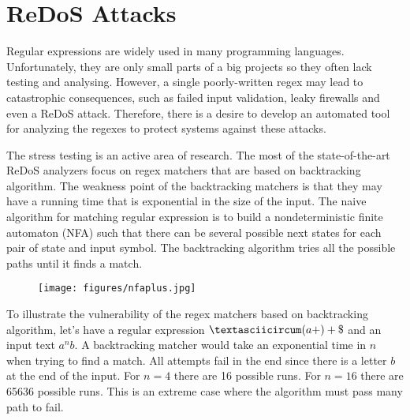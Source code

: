 \documentclass[acmsmall,screen]{acmart}
\begin{document}
\section{ReDoS Attacks}\label{sec:redos}
Regular expressions are widely used in many programming languages.
%
Unfortunately, they are only small parts of a big projects so they often lack testing and analysing.
%
However, a single poorly-written regex may lead to catastrophic consequences, such as failed input validation, leaky firewalls and 
%
even a ReDoS attack.
% 
Therefore, there is a desire to develop an automated tool for analyzing the regexes to protect systems against these attacks.
%



The stress testing is an active area of research.
%
The most of the state-of-the-art ReDoS analyzers focus on regex matchers that are based on backtracking algorithm.
%
The weakness point of the backtracking
matchers is that they may have a running time that is exponential in the size of the input.
%
The naive algorithm for matching regular expression is to build a nondeterministic finite automaton (NFA) such that there can
be several possible next states for each pair of state and input symbol. 
%
The backtracking algorithm tries all the possible paths until it finds a match.

\begin{figure}
  \vspace{-3mm}
  \hspace{-10mm}
  \begin{center}
    \texttt{[image: figures/nfaplus.jpg]}
  \end{center}
  \label{fig:nfaplus}
\end{figure}

\begin{example}
To illustrate the vulnerability of the regex matchers based on backtracking algorithm, let's have a regular expression $\textasciicircum(a+)+\$$
and an input text $a^nb$.
%
A backtracking matcher would take an exponential time in $n$ when trying to find a match.
%
All attempts fail in the end since there is a letter $b$ at the end of the input.
%
For $n=4$ there are 16 possible runs. 
%
For $n=16$ there are 65636 possible runs. 
%
This is an extreme case where the algorithm must pass many path to fail.
\end{example}
\end{document}
